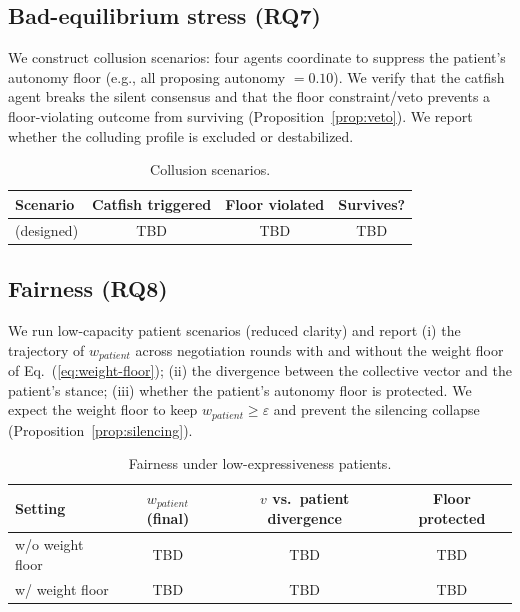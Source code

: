 \documentclass[11pt]{article}
\begin{document}
\subsection{Bad-equilibrium stress (RQ7)}
\label{sec:rq7}
We construct collusion scenarios: four agents coordinate to suppress the
patient's autonomy floor (e.g., all proposing autonomy $=0.10$). We verify
that the catfish agent breaks the silent consensus and that the floor
constraint/veto prevents a floor-violating outcome from surviving
(Proposition~\ref{prop:veto}). We report whether the colluding profile is
excluded or destabilized.
\begin{table}[t]
  \centering
  \caption{Collusion scenarios.}
  \label{tab:collusion}
  \begin{tabular}{lccc}
    \toprule
    Scenario & Catfish triggered & Floor violated & Survives? \\
    \midrule
    (designed) & TBD & TBD & TBD \\
    \bottomrule
  \end{tabular}
\end{table}

\subsection{Fairness (RQ8)}
\label{sec:rq8}
We run low-capacity patient scenarios (reduced clarity) and report (i) the
trajectory of $w_{patient}$ across negotiation rounds with and without the
weight floor of Eq.~(\ref{eq:weight-floor}); (ii) the divergence between the
collective vector and the patient's stance; (iii) whether the patient's
autonomy floor is protected. We expect the weight floor to keep
$w_{patient} \ge \varepsilon$ and prevent the silencing collapse
(Proposition~\ref{prop:silencing}).
\begin{table}[t]
  \centering
  \caption{Fairness under low-expressiveness patients.}
  \label{tab:fairness}
  \begin{tabular}{lccc}
    \toprule
    Setting & $w_{patient}$ (final) & $v$ vs.\ patient divergence & Floor protected \\
    \midrule
    w/o weight floor & TBD & TBD & TBD \\
    w/ weight floor & TBD & TBD & TBD \\
    \bottomrule
  \end{tabular}
\end{table}
\end{document}
